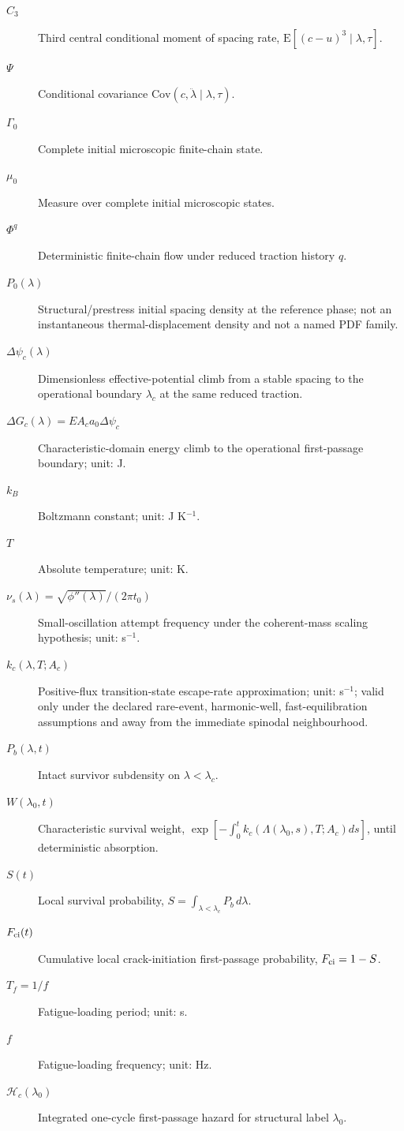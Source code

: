 \begin{description}
\item[$C_3$] Third central conditional moment of spacing rate, $\mathrm E[(c-u)^3\mid\lambda,\tau]$.
\item[$\Psi$] Conditional covariance $\mathrm{Cov}(c,\ddot\lambda\mid\lambda,\tau)$.
\item[$\Gamma_0$] Complete initial microscopic finite-chain state.
\item[$\mu_0$] Measure over complete initial microscopic states.
\item[$\Phi^q$] Deterministic finite-chain flow under reduced traction history $q$.
\item[$P_0(\lambda)$] Structural/prestress initial spacing density at the reference phase; not an instantaneous thermal-displacement density and not a named PDF family.
\item[$\Delta\psi_c(\lambda)$] Dimensionless effective-potential climb from a stable spacing to the operational boundary $\lambda_c$ at the same reduced traction.
\item[$\Delta G_c(\lambda)=EA_ca_0\Delta\psi_c$] Characteristic-domain energy climb to the operational first-passage boundary; unit: J.
\item[$k_B$] Boltzmann constant; unit: J K$^{-1}$.
\item[$T$] Absolute temperature; unit: K.
\item[$\nu_s(\lambda)=\sqrt{\phi''(\lambda)}/(2\pi t_0)$] Small-oscillation attempt frequency under the coherent-mass scaling hypothesis; unit: s$^{-1}$.
\item[$k_c(\lambda,T;A_c)$] Positive-flux transition-state escape-rate approximation; unit: s$^{-1}$; valid only under the declared rare-event, harmonic-well, fast-equilibration assumptions and away from the immediate spinodal neighbourhood.
\item[$P_b(\lambda,t)$] Intact survivor subdensity on $\lambda<\lambda_c$.
\item[$W(\lambda_0,t)$] Characteristic survival weight, $\exp[-\int_0^t k_c(\Lambda(\lambda_0,s),T;A_c)ds]$, until deterministic absorption.
\item[$S(t)$] Local survival probability, $S=\int_{\lambda<\lambda_c}P_b\,d\lambda$.
\item[$F_{\rm ci}(t)$] Cumulative local crack-initiation first-passage probability, $F_{\rm ci}=1-S$.
\item[$T_f=1/f$] Fatigue-loading period; unit: s.
\item[$f$] Fatigue-loading frequency; unit: Hz.
\item[$\mathcal H_c(\lambda_0)$] Integrated one-cycle first-passage hazard for structural label $\lambda_0$.

\end{description}
